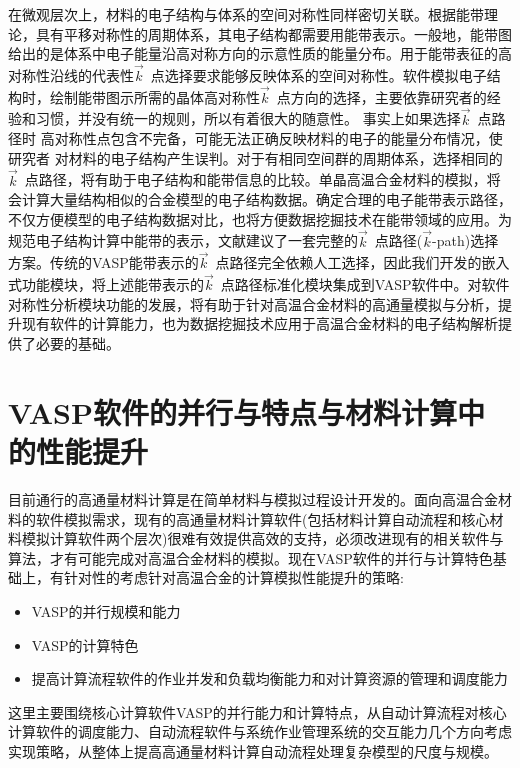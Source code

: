 在微观层次上，材料的电子结构与体系的空间对称性同样密切关联。根据能带理论，具有平移对称性的周期体系，其电子结构都需要用能带表示。一般地，能带图给出的是体系中电子能量沿高对称方向的示意性质的能量分布。用于能带表征的高对称性沿线的代表性$\vec k$~点选择要求能够反映体系的空间对称性。软件模拟电子结构时，绘制能带图示所需的晶体高对称性$\vec k$~点方向的选择，主要依靠研究者的经验和习惯，并没有统一的规则，所以有着很大的随意性。%
事实上如果选择$\vec k$~点路径时%
高对称性点包含不完备，可能无法正确反映材料的电子的能量分布情况，使研究者%
对材料的电子结构产生误判。对于有相同空间群的周期体系，选择相同的$\vec k$~点路径，将有助于电子结构和能带信息的比较。单晶高温合金材料的模拟，将会计算大量结构相似的合金模型的电子结构数据。确定合理的电子能带表示路径，不仅方便模型的电子结构数据对比，也将方便数据挖掘技术在能带领域的应用。为规范电子结构计算中能带的表示，文献\cite{CMS49-299_2010}建议了一套完整的$\vec k$~点路径($\vec k$-\textrm{path})选择方案。传统的\textrm{VASP}能带表示的$\vec k$~点路径完全依赖人工选择，因此我们开发的嵌入式功能模块，将上述能带表示的$\vec k$~点路径标准化模块集成到\textrm{VASP}软件中。对软件对称性分析模块功能的发展，将有助于针对高温合金材料的高通量模拟与分析，提升现有软件的计算能力，也为数据挖掘技术应用于高温合金材料的电子结构解析提供了必要的基础。

\section{\rm{VASP}软件的并行与特点与材料计算中的性能提升}
目前通行的高通量材料计算是在简单材料与模拟过程设计开发的。面向高温合金材料的软件模拟需求，现有的高通量材料计算软件(包括材料计算自动流程和核心材料模拟计算软件两个层次)很难有效提供高效的支持，必须改进现有的相关软件与算法，才有可能完成对高温合金材料的模拟。现在\textrm{VASP}软件的并行与计算特色基础上，有针对性的考虑针对高温合金的计算模拟性能提升的策略:
\begin{itemize}
	\item \textrm{VASP}的并行规模和能力
	\item \textrm{VASP}的计算特色
	\item 提高计算流程软件的作业并发和负载均衡能力和对计算资源的管理和调度能力
\end{itemize}
这里主要围绕核心计算软件\textrm{VASP}的并行能力和计算特点，从自动计算流程对核心计算软件的调度能力、自动流程软件与系统作业管理系统的交互能力几个方向考虑实现策略，从整体上提高高通量材料计算自动流程处理复杂模型的尺度与规模。

